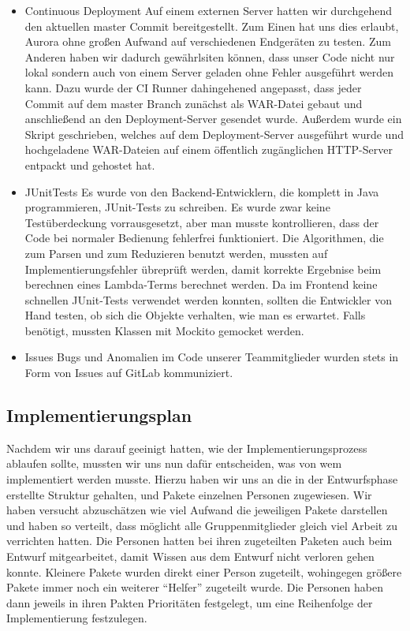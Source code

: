 \documentclass[parskip=full,11pt,twoside]{scrartcl}
\begin{document}
\begin{itemize}
    \item Continuous Deployment
        \newline
        Auf einem externen Server hatten wir durchgehend den aktuellen master Commit bereitgestellt.
        Zum Einen hat uns dies erlaubt, Aurora ohne großen Aufwand auf verschiedenen Endgeräten zu testen.
        Zum Anderen haben wir dadurch gewährlsiten können, dass unser Code nicht nur lokal sondern auch von einem Server geladen ohne Fehler ausgeführt werden kann.
		Dazu wurde der CI Runner dahingehened angepasst, dass jeder Commit auf dem master Branch zunächst als WAR-Datei
		gebaut und anschließend an den Deployment-Server gesendet wurde.
		Außerdem wurde ein Skript geschrieben, welches auf dem Deployment-Server ausgeführt wurde und hochgeladene
		WAR-Dateien auf einem öffentlich zugänglichen HTTP-Server entpackt und gehostet hat.

       \item JUnitTests
       \newline
      	Es wurde von den Backend-Entwicklern, die komplett in Java programmieren, JUnit-Tests zu schreiben.
      	Es wurde zwar keine Testüberdeckung vorrausgesetzt, aber man musste kontrollieren, dass der Code bei normaler Bedienung fehlerfrei funktioniert.
      	Die Algorithmen, die zum Parsen und zum Reduzieren benutzt werden, mussten auf Implementierungsfehler übreprüft werden, damit korrekte Ergebnise beim berechnen eines Lambda-Terms berechnet werden.
      	Da im Frontend keine schnellen JUnit-Tests verwendet werden konnten, sollten die Entwickler von Hand testen, ob sich die Objekte verhalten, wie man es erwartet.
      	Falls benötigt, mussten Klassen mit Mockito gemocket werden.
      	\item Issues
        \newline
      	Bugs und Anomalien im Code unserer Teammitglieder wurden stets in Form von Issues auf GitLab kommuniziert.
      	\end{itemize}

\subsection{Implementierungsplan}
Nachdem wir uns darauf geeinigt hatten, wie der Implementierungsprozess ablaufen sollte, mussten wir uns nun dafür entscheiden, was von wem implementiert werden musste.
Hierzu haben wir uns an die in der Entwurfsphase erstellte Struktur gehalten, und Pakete einzelnen Personen zugewiesen.
Wir haben versucht abzuschätzen wie viel Aufwand die jeweiligen Pakete darstellen und haben so verteilt, dass möglicht alle Gruppenmitglieder gleich viel Arbeit zu verrichten hatten.
Die Personen hatten bei ihren zugeteilten Paketen auch beim Entwurf mitgearbeitet, damit Wissen aus dem Entwurf nicht verloren gehen konnte.
Kleinere Pakete wurden direkt einer Person zugeteilt, wohingegen größere Pakete immer noch ein weiterer \enquote{Helfer} zugeteilt wurde.
Die Personen haben dann jeweils in ihren Pakten Prioritäten festgelegt, um eine Reihenfolge der Implementierung festzulegen.
\end{document}
